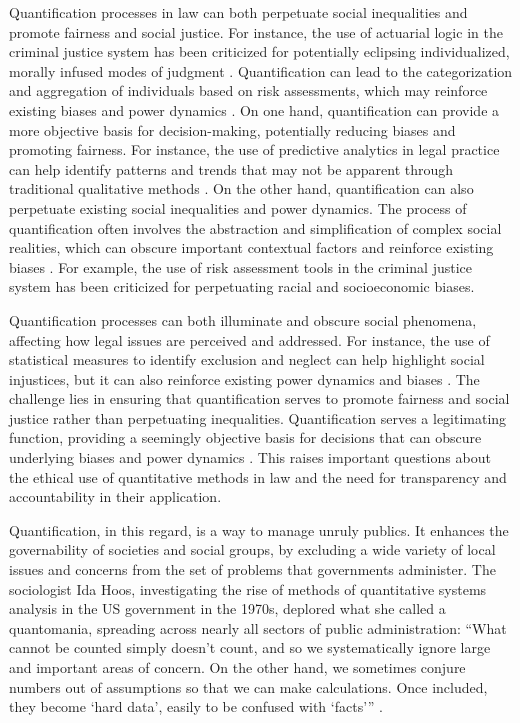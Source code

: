 Quantification processes in law can both perpetuate social inequalities and promote fairness and social justice. For instance, the use of actuarial logic in the criminal justice system has been criticized for potentially eclipsing individualized, morally infused modes of judgment \cite{101111lsi12334}. Quantification can lead to the categorization and aggregation of individuals based on risk assessments, which may reinforce existing biases and power dynamics \cite{101111lsi12334}. On one hand, quantification can provide a more objective basis for decision-making, potentially reducing biases and promoting fairness. For instance, the use of predictive analytics in legal practice can help identify patterns and trends that may not be apparent through traditional qualitative methods \cite{silva2023role}. On the other hand, quantification can also perpetuate existing social inequalities and power dynamics. The process of quantification often involves the abstraction and simplification of complex social realities, which can obscure important contextual factors and reinforce existing biases \cite{101057s4159902003965}. For example, the use of risk assessment tools in the criminal justice system has been criticized for perpetuating racial and socioeconomic biases.

Quantification processes can both illuminate and obscure social phenomena, affecting how legal issues are perceived and addressed. For instance, the use of statistical measures to identify exclusion and neglect can help highlight social injustices, but it can also reinforce existing power dynamics and biases \cite{101057s4159902003965}. The challenge lies in ensuring that quantification serves to promote fairness and social justice rather than perpetuating inequalities. Quantification serves a legitimating function, providing a seemingly objective basis for decisions that can obscure underlying biases and power dynamics \cite{101057s4159902003965}. This raises important questions about the ethical use of quantitative methods in law and the need for transparency and accountability in their application.

Quantification, in this regard, is a way to manage unruly publics. It enhances the governability of societies and social groups, by excluding a wide variety of local issues and concerns from the set of problems that governments administer. The sociologist Ida Hoos, investigating the rise of methods of quantitative systems analysis in the US government in the 1970s, deplored what she called a quantomania, spreading across nearly all sectors of public administration: “What cannot be counted simply doesn’t count, and so we systematically ignore large and important areas of concern. On the other hand, we sometimes conjure numbers out of assumptions so that we can make calculations. Once included, they become ‘hard data’, easily to be confused with ‘facts’” \cite{ribeiro2021quantification}.

